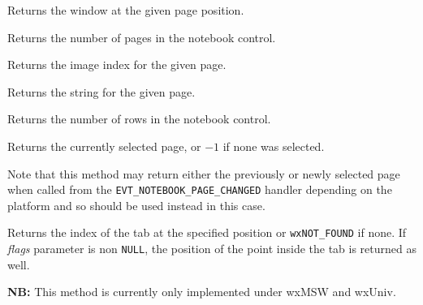 Returns the window at the given page position.

\label{wxnotebookgetpagecount}


Returns the number of pages in the notebook control.

\label{wxnotebookgetpageimage}


Returns the image index for the given page.

\label{wxnotebookgetpagetext}


Returns the string for the given page.

\label{wxnotebookgetrowcount}


Returns the number of rows in the notebook control.

\label{wxnotebookgetselection}


Returns the currently selected page, or $-1$ if none was selected.

Note that this method may return either the previously or newly selected page
when called from the {\tt EVT\_NOTEBOOK\_PAGE\_CHANGED} handler depending on
the platform and so\rtfsp
{} should be
used instead in this case.

\label{wxnotebookhittest}


Returns the index of the tab at the specified position or {\tt wxNOT\_FOUND} 
if none. If {\it flags} parameter is non {\tt NULL}, the position of the point
inside the tab is returned as well.

{\bf NB: } This method is currently only implemented under wxMSW and wxUniv.




